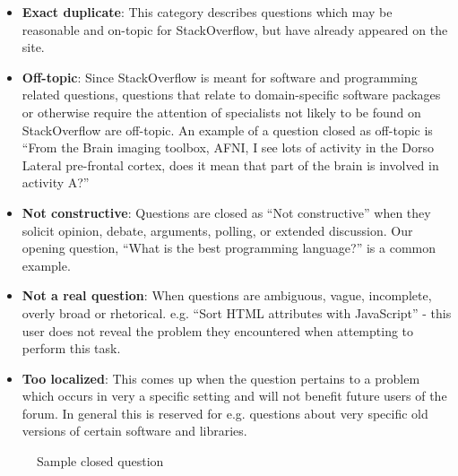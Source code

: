 \documentclass[11pt]{article}
\begin{document}
\begin{itemize}
\item \textbf{Exact duplicate}: This category describes questions which may be reasonable and on-topic for StackOverflow, but have already appeared on the site.
\item \textbf{Off-topic}: Since StackOverflow is meant for software and programming related questions, questions that relate to domain-specific software packages or otherwise require the attention of specialists not likely to be found on StackOverflow are off-topic. An example of a question closed as off-topic is ``From the Brain imaging toolbox, AFNI, I see lots of activity in the Dorso Lateral pre-frontal cortex, does it mean that part of the brain is involved in activity A?''
\item \textbf{Not constructive}: Questions are closed as ``Not constructive'' when they solicit opinion, debate, arguments, polling, or extended discussion. Our opening question, ``What is the best programming language?'' is a common example.
\item \textbf{Not a real question}: When questions are ambiguous, vague, incomplete, overly broad or rhetorical. e.g. ``Sort HTML attributes with JavaScript'' - this user does not reveal the problem they encountered when attempting to perform this task.
\item \textbf{Too localized}: This comes up when the question pertains to a problem which occurs in very a specific setting and will not benefit future users of the forum. In general this is reserved for e.g. questions about very specific old versions of certain software and libraries.
\end{itemize}

\begin{figure}
\centering
{}
\caption{Sample closed question}
\label{fig:sample}
\end{figure}
\end{document}

